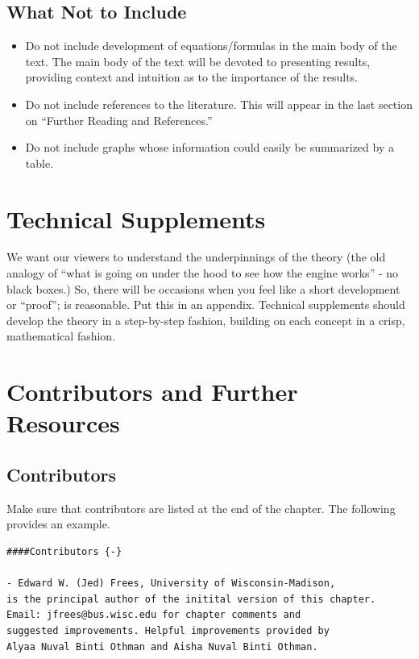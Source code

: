 \documentclass[]{book}
\theoremstyle{definition}
\theoremstyle{definition}
\theoremstyle{definition}
\theoremstyle{remark}
\begin{document}
\subsection{What Not to Include}\label{what-not-to-include}

\begin{itemize}
\item
  Do not include development of equations/formulas in the main body of
  the text. The main body of the text will be devoted to presenting
  results, providing context and intuition as to the importance of the
  results.
\item
  Do not include references to the literature. This will appear in the
  last section on ``Further Reading and References.''
\item
  Do not include graphs whose information could easily be summarized by
  a table.
\end{itemize}

\section{Technical Supplements}\label{technical-supplements}

We want our viewers to understand the underpinnings of the theory (the
old analogy of ``what is going on under the hood to see how the engine
works'' - no black boxes.) So, there will be occasions when you feel
like a short development or ``proof''; is reasonable. Put this in an
appendix. Technical supplements should develop the theory in a
step-by-step fashion, building on each concept in a crisp, mathematical
fashion.

\section{Contributors and Further
Resources}\label{S:further-reading-and-resources}

\subsection{Contributors}\label{contributors}

Make sure that contributors are listed at the end of the chapter. The
following provides an example.

\begin{verbatim}
####Contributors {-}

- Edward W. (Jed) Frees, University of Wisconsin-Madison, 
is the principal author of the initital version of this chapter. 
Email: jfrees@bus.wisc.edu for chapter comments and 
suggested improvements. Helpful improvements provided by
Alyaa Nuval Binti Othman and Aisha Nuval Binti Othman.
\end{verbatim}
\end{document}
